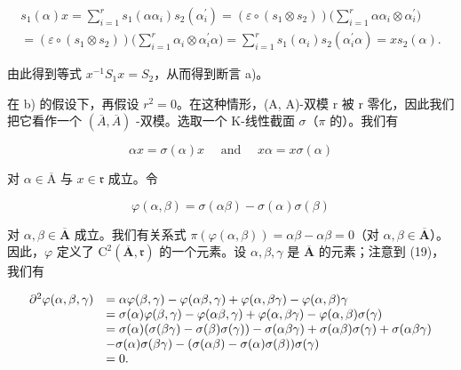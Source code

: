 \[
\begin{array}{l} s _ {1} (\alpha) x = \sum_ {i = 1} ^ {r} s _ {1} (\alpha \alpha_ {i}) s _ {2} (\alpha_ {i} ^ {\prime}) = (\varepsilon \circ (s _ {1} \otimes s _ {2})) \biggl (\sum_ {i = 1} ^ {r} \alpha \alpha_ {i} \otimes \alpha_ {i} ^ {\prime} \biggr) \\ = (\varepsilon \circ (s _ {1} \otimes s _ {2})) \biggl (\sum_ {i = 1} ^ {r} \alpha_ {i} \otimes \alpha_ {i} ^ {\prime} \alpha \biggr) = \sum_ {i = 1} ^ {r} s _ {1} (\alpha_ {i}) s _ {2} (\alpha_ {i} ^ {\prime} \alpha) = x s _ {2} (\alpha). \end{array}
\]

由此得到等式 \(x^{-1}S_{1}x = S_{2}\)，从而得到断言 a)。

在 b) 的假设下，再假设 \(r^{2}=0\)。在这种情形，(A, A)-双模 r 被 r 零化，因此我们把它看作一个 \((\overline{A},\overline{A})\) -双模。选取一个 K-线性截面 \(\sigma\)（\(\pi\) 的）。我们有

\[
\alpha x = \sigma (\alpha) x \quad \text { and } \quad x \alpha = x \sigma (\alpha)\tag{19}
\]

对 \(\alpha \in \overline{\mathrm{A}}\) 与 \(x\in \mathfrak{r}\) 成立。令

\[
\varphi (\alpha , \beta) = \sigma (\alpha \beta) - \sigma (\alpha) \sigma (\beta)\tag{20}
\]

对 \(\alpha, \beta \in \overline{\mathbf{A}}\) 成立。我们有关系式 \(\pi(\varphi(\alpha, \beta)) = \alpha\beta - \alpha\beta = 0\)（对 \(\alpha, \beta \in \overline{\mathbf{A}}\)）。因此，\(\varphi\) 定义了 \(\mathrm{C}^2(\overline{\mathbf{A}}, \mathfrak{r})\) 的一个元素。设 \(\alpha, \beta, \gamma\) 是 \(\overline{\mathbf{A}}\) 的元素；注意到 (19)，我们有

\[
\begin{array}{r l} \partial^ {2} \varphi (\alpha , \beta , \gamma) & = \alpha \varphi (\beta , \gamma) - \varphi (\alpha \beta , \gamma) + \varphi (\alpha , \beta \gamma) - \varphi (\alpha , \beta) \gamma \\ & = \sigma (\alpha) \varphi (\beta , \gamma) - \varphi (\alpha \beta , \gamma) + \varphi (\alpha , \beta \gamma) - \varphi (\alpha , \beta) \sigma (\gamma) \\ & = \sigma (\alpha) (\sigma (\beta \gamma) - \sigma (\beta) \sigma (\gamma)) - \sigma (\alpha \beta \gamma) + \sigma (\alpha \beta) \sigma (\gamma) + \sigma (\alpha \beta \gamma) \\ & - \sigma (\alpha) \sigma (\beta \gamma) - (\sigma (\alpha \beta) - \sigma (\alpha) \sigma (\beta)) \sigma (\gamma) \\ & = 0. \end{array}
\]

